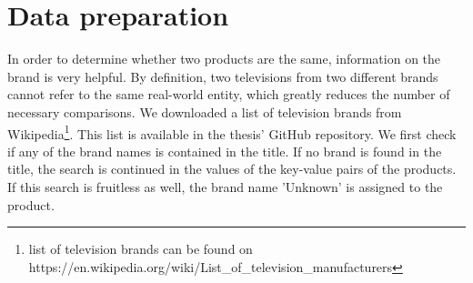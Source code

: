 \section{Data preparation}
\label{section:data:data_preparation}
In order to determine whether two products are the same, information on the brand is very helpful. By definition, two televisions from two different brands cannot refer to the same real-world entity, which greatly reduces the number of necessary comparisons. We downloaded a list of television brands from Wikipedia\footnote{list of television brands can be found on https://en.wikipedia.org/wiki/List\_of\_television\_manufacturers}. This list is available in the thesis' GitHub repository. We first check if any of the brand names is contained in the title. If no brand is found in the title, the search is continued in the values of the key-value pairs of the products. If this search is fruitless as well, the brand name 'Unknown' is assigned to the product. 
